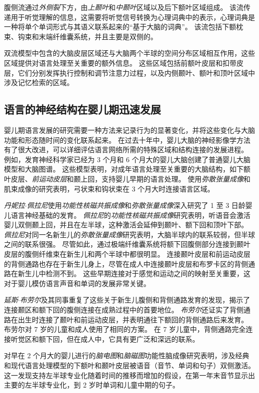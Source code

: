 腹侧流通过\textit{外侧裂}下方，由\textit{上颞叶}和\textit{中颞叶}区域以及后下额叶区域组成。
该流传递用于听觉理解的信息，这需要将听觉信号转换为心理词典中的表示，心理词典是一种将单个单词形式与其语义联系起来的“基于大脑的词典”。
该流包括下额枕束、钩束和末端纤维囊系统，并且主要是双侧的。


双流模型中包含的大脑皮层区域还与大脑两个半球的空间分布区域相互作用，这些区域提供对语言处理至关重要的额外信息。
这些区域包括前额叶皮层和扣带皮层，它们分别发挥执行控制和调节注意力过程，以及内侧颞叶、额叶和顶叶区域中涉及记忆检索的区域。




\subsection{语言的神经结构在婴儿期迅速发展}

婴儿期语言发展的研究需要一种方法来记录行为的显著变化，并将这些变化与大脑功能和形态随时间的变化联系起来。
在过去十年中，婴儿大脑的神经影像学方法有了很大改进，可以详细评估语言网络所需的特殊区域和结构连接的发展进程。
例如，发育神经科学家已经为 3 个月和 6 个月大的婴儿大脑创建了普通婴儿大脑模型和大脑图谱。
这些模型表明，对成年语言处理至关重要的大脑结构，如下额叶皮层、\textit{前运动皮层}和颞上回，支持婴儿早期的语言处理。
使用\textit{弥散张量成像}和肌束成像的研究表明，弓状束和钩状束在 3 个月大时连接语言区域。


\textit{丹妮拉$\cdot$佩拉尼}使用\textit{功能性核磁共振成像}和\textit{弥散张量成像}深入研究了 1 至 3 日龄婴儿语言神经基础的发育。
\textit{佩拉尼}的\textit{功能性核磁共振成像}研究表明，听语音会激活婴儿双侧颞上回，并且在左半球，这种激活会延伸到颞叶、额下回和顶叶下部。
\textit{佩拉尼}对同一名新生儿的\textit{弥散张量成像}研究表明，大脑半球内的联系较弱，但半球之间的联系很强。
尽管如此，通过极端纤维囊系统将额下回腹侧部分连接到颞叶皮层的腹侧纤维束在新生儿和两个半球中都很明显。
连接颞叶皮层和前运动皮层的背侧通路也存在于新生儿身上，尽管在成人中连接颞叶皮层和布罗卡区的背侧通路在新生儿中检测不到。
这些早期连接对于感觉和运动之间的映射至关重要，这对于婴儿模仿语言声音和单词的发展非常关键。


\textit{延斯$\cdot$布劳尔}及其同事重复了这些关于新生儿腹侧和背侧通路发育的发现，揭示了连接颞区和额下回的腹侧连接在成熟过程中的首要地位。
\textit{布劳尔}还证实了背侧通路在出生时连接了颞叶和前运动皮层，并表明通往下额回的背侧通路后来发育。
布劳尔对 7 岁的儿童和成人使用了相同的方案。
在 7 岁儿童中，背侧通路完全连接听觉区和额下回，但在成人中，它具有更广泛和深远的联系。


对早在 2 个月大的婴儿进行的\textit{脑电图}和\textit{脑磁图}功能性脑成像研究表明，涉及经典和现代语言处理模型的下额叶和颞叶皮层被语音（音节、单词和句子）双侧激活。
这一发现支持左半球专业化随着时间的推移而增加的假设，在第一年末音节显示出主要的左半球专业化，到 2 岁时单词和儿童中期的句子。


